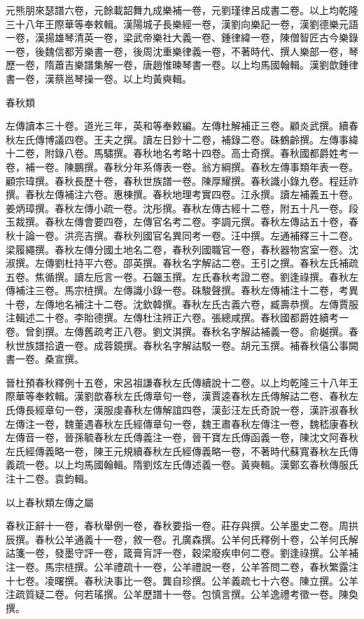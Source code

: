 \begin{pinyinscope}
元熊朋來瑟譜六卷，元餘載韶舞九成樂補一卷，元劉瑾律呂成書二卷。以上均乾隆三十八年王際華等奉敕輯。漢陽城子長樂經一卷，漢劉向樂記一卷，漢劉德樂元語一卷，漢揚雄琴清英一卷，梁武帝樂社大義一卷、鍾律緯一卷，陳僧智匠古今樂錄一卷，後魏信都芳樂書一卷，後周沈重樂律義一卷，不著時代、撰人樂部一卷，琴歷一卷，隋蕭吉樂譜集解一卷，唐趙惟暕琴書一卷。以上均馬國翰輯。漢劉歆鍾律書一卷，漢蔡邕琴操一卷。以上均黃奭輯。

春秋類

左傳讀本三十卷。道光三年，英和等奉敕編。左傳杜解補正三卷。顧炎武撰。續春秋左氏傳博議四卷。王夫之撰。讀左日鈔十二卷，補錄二卷。硃鶴齡撰。左傳事緯十二卷，附錄八卷。馬驌撰。春秋地名考略十四卷。高士奇撰。春秋國都爵姓考一卷，補一卷。陳鵬撰。春秋分年系傳表一卷。翁方綱撰。春秋左傳事類年表一卷。顧宗瑋撰。春秋長歷十卷，春秋世族譜一卷。陳厚耀撰。春秋識小錄九卷。程廷祚撰。春秋左傳補注六卷。惠棟撰。春秋地理考實四卷。江永撰。讀左補義五十卷。姜炳璋撰。春秋左傳小疏一卷。沈彤撰。春秋左傳古經十二卷，附五十凡一卷。段玉裁撰。春秋左傳會要四卷，左傳官名考二卷。李調元撰。春秋左傳詁五十卷，春秋十論一卷。洪亮吉撰。春秋列國官名異同考一卷。汪中撰。左通補釋三十二卷。梁履繩撰。春秋左傳分國土地名二卷，春秋列國職官一卷，春秋器物宮室一卷。沈淑撰。左傳劉杜持平六卷。邵英撰。春秋名字解詁二卷。王引之撰。春秋左氏補疏五卷。焦循撰。讀左卮言一卷。石韞玉撰。左氏春秋考證二卷。劉逢祿撰。春秋左傳補注三卷。馬宗梿撰。左傳識小錄一卷。硃駿聲撰。春秋左傳補注十二卷，考異十卷，左傳地名補注十二卷。沈欽韓撰。春秋左氏古義六卷，臧壽恭撰。左傳賈服注輯述二十卷。李貽德撰。左傳杜注辨正六卷。張總咸撰。春秋國都爵姓續考一卷。曾釗撰。左傳舊疏考正八卷。劉文淇撰。春秋名字解詁補義一卷。俞樾撰。春秋世族譜拾遺一卷。成蓉鏡撰。春秋名字解詁駁一卷。胡元玉撰。補春秋僖公事闕書一卷。桑宣撰。

晉杜預春秋釋例十五卷，宋呂祖謙春秋左氏傳續說十二卷。以上均乾隆三十八年王際華等奉敕輯。漢劉歆春秋左氏傳章句一卷，漢賈逵春秋左氏傳解詁二卷、春秋左氏傳長經章句一卷，漢服虔春秋左傳解誼四卷，漢彭汪左氏奇說一卷，漢許淑春秋左傳注一卷，魏董遇春秋左氏經傳章句一卷，魏王肅春秋左傳注一卷，魏嵇康春秋左傳音一卷，晉孫毓春秋左氏傳義注一卷，晉干寶左氏傳函義一卷，陳沈文阿春秋左氏經傳義略一卷，陳王元規續春秋左氏經傳義略一卷，不著時代蘇寬春秋左氏傳義疏一卷。以上均馬國翰輯。隋劉炫左氏傳述義一卷。黃奭輯。漢鄭玄春秋傳服氏注十二卷。袁鈞輯。

以上春秋類左傳之屬

春秋正辭十一卷，春秋舉例一卷，春秋要指一卷。莊存與撰。公羊墨史二卷。周拱辰撰。春秋公羊通義十一卷，敘一卷。孔廣森撰。公羊何氏釋例十卷，公羊何氏解詁箋一卷，發墨守評一卷，箴膏肓評一卷，穀梁廢疾申何二卷。劉逢祿撰。公羊補注一卷。馬宗梿撰。公羊禮疏十一卷，公羊禮說一卷，公羊答問二卷，春秋繁露注十七卷。凌曙撰。春秋決事比一卷。龔自珍撰。公羊義疏七十六卷。陳立撰。公羊注疏質疑二卷。何若瑤撰。公羊歷譜十一卷。包慎言撰。公羊逸禮考徵一卷。陳奐撰。


\end{pinyinscope}
